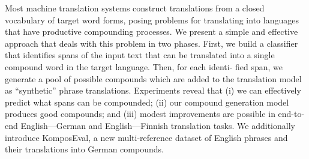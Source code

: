 Most machine translation systems construct translations from a closed vocabulary of target word forms, posing problems for translating into languages that have productive compounding processes. We present a simple and effective approach that deals with this problem in two phases. First, we build a classifier that identifies spans of the input text that can be translated into a single compound word in the target language. Then, for each identi- fied span, we generate a pool of possible compounds which are added to the translation model as ``synthetic'' phrase translations. Experiments reveal that (i) we can effectively predict what spans can be compounded; (ii) our compound generation model produces good compounds; and (iii) modest improvements are possible in end-to-end English---German and English---Finnish translation tasks. We additionally introduce KomposEval, a new multi-reference dataset of English phrases and their translations into German compounds.
